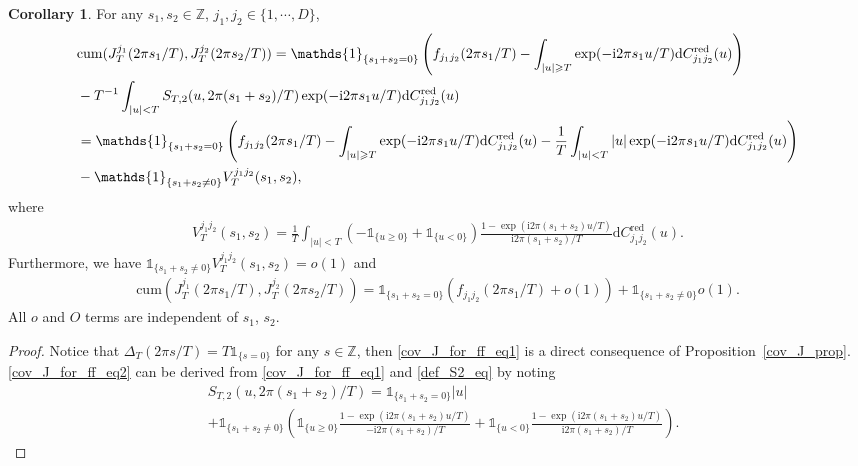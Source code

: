 \documentclass[11pt]{article}
\numberwithin{equation}{section}
\theoremstyle{plain}
\theoremstyle{definition}
\theoremstyle{definition}
\theoremstyle{assumption}
\theoremstyle{proposition}
\theoremstyle{proposition}
\newtheorem{corollary}{Corollary}[section]
\theoremstyle{example}
\theoremstyle{lemma}
\theoremstyle{theorem}
\theoremstyle{remark}
\begin{document}
\begin{corollary}\label{cov_J_corollary}
For any $s_1,s_2\in\mathbb{Z}$, $j_1,j_2\in\{1,\cdots,D\}$,
\begin{align}\label{cov_J_for_ff_eq1}
&\mathrm{cum}(J_T^{j_1}(2\pi s_1/T), J_T^{j_2}(2\pi s_2/T)) 
=\mathds{1}_{\{s_1 + s_2 = 0\}}\left(f_{j_1 j_2}(2\pi s_1/T) - \int_{|u|\geqslant T} \exp(-\mathrm{i}2\pi s_1 u/T)\mathrm{d}C_{j_1j_2}^{\mathrm{red}}(u) \right) \notag \\
&-T^{-1} \int_{|u|< T} S_{T,2}(u, 2\pi(s_1+s_2)/T) \exp(-\mathrm{i}2\pi s_1 u/T)\mathrm{d}C_{j_1j_2}^{\mathrm{red}}(u) \\
&=\mathds{1}_{\{s_1 + s_2 = 0\}}\left(f_{j_1 j_2}(2\pi s_1/T) - \int_{|u|\geqslant T} \exp(-\mathrm{i}2\pi s_1 u/T)\mathrm{d}C_{j_1j_2}^{\mathrm{red}}(u) - \frac{1}{T}\int_{|u|<T} |u| \exp(-\mathrm{i}2\pi s_1 u/T)\mathrm{d}C_{j_1j_2}^{\mathrm{red}}(u) \right) \notag \\
&- \mathds{1}_{\{s_1 + s_2 \neq 0\}}V_{T}^{j_1 j_2}(s_1,s_2),\label{cov_J_for_ff_eq2}
\end{align} 
where
\begin{align*}
V_{T}^{j_1 j_2}(s_1,s_2) = \frac{1}{T}\int_{|u|<T}\left(-\mathds{1}_{\{u \geqslant 0\}} + \mathds{1}_{\{u < 0\}}\right)\frac{1 - \exp(\mathrm{i}2\pi(s_1+s_2) u /T)}{\mathrm{i}2\pi(s_1+s_2)/T}\mathrm{d}C_{j_1j_2}^{\mathrm{red}}(u) .    
\end{align*}
Furthermore, we have
$\mathds{1}_{\{s_1 + s_2 \neq 0\}}V_{T}^{j_1 j_2}(s_1,s_2) = o(1)$ and
\begin{align*}
\mathrm{cum}(J_T^{j_1}(2\pi s_1/T), J_T^{j_2}(2\pi s_2/T)) 
=\mathds{1}_{\{s_1 + s_2 = 0\}}( f_{j_1 j_2}(2\pi s_1/T) + o(1)) + \mathds{1}_{\{s_1 + s_2 \neq 0\}}o(1).
\end{align*}
All $o$ and $O$ terms are independent of $s_1$, $s_2$.
\begin{proof}
Notice that $\Delta_T(2\pi s/T) = T\mathds{1}_{\{s = 0\}}$ for any $s\in\mathbb{Z}$, then \eqref{cov_J_for_ff_eq1} is a direct consequence of Proposition~\ref{cov_J_prop}. \eqref{cov_J_for_ff_eq2} can be derived from \eqref{cov_J_for_ff_eq1} and \eqref{def_S2_eq} by noting
\begin{align*}
&S_{T,2}(u, 2\pi(s_1+s_2)/T) 
= \mathds{1}_{\{s_1 + s_2 = 0\}} |u| \\
&+  \mathds{1}_{\{s_1 + s_2 \neq 0\}}\left(\mathds{1}_{\{u \geqslant 0\}} \frac{1 - \exp(\mathrm{i}2\pi(s_1+s_2) u /T)}{-\mathrm{i}2\pi(s_1+s_2)/T}
+\mathds{1}_{\{u < 0\}} \frac{1 - \exp(\mathrm{i}2\pi(s_1+s_2) u /T)}{\mathrm{i}2\pi(s_1+s_2)/T}\right) .

\end{align*}
\end{proof}
\end{corollary}
\end{document}
